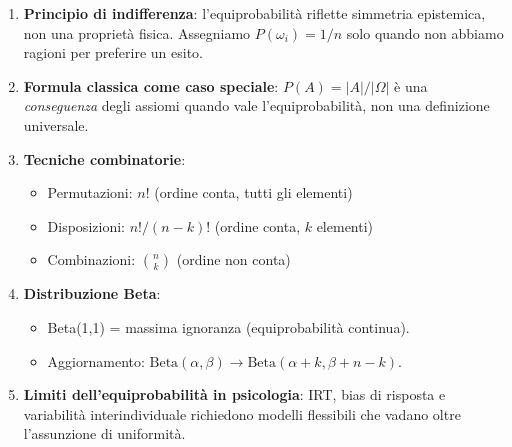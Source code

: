 \documentclass[
  italian,
  letterpaper,
  a4paper,
  11pt,
  open=any]{scrbook}
\providecommand{\tightlist}{%
  \setlength{\itemsep}{0pt}\setlength{\parskip}{0pt}}
\theoremstyle{plain}
\theoremstyle{definition}
\theoremstyle{definition}
\theoremstyle{remark}
\begin{document}
\begin{tcolorbox}[enhanced jigsaw, arc=.35mm, bottomrule=.15mm, bottomtitle=1mm, breakable, colback=white, colbacktitle=quarto-callout-important-color!10!white, colframe=quarto-callout-important-color-frame, coltitle=black, left=2mm, leftrule=.75mm, opacityback=0, opacitybacktitle=0.6, rightrule=.15mm, title=\textcolor{quarto-callout-important-color}{\faExclamation}\hspace{0.5em}{Importante}, titlerule=0mm, toprule=.15mm, toptitle=1mm]

\begin{enumerate}
\def\labelenumi{\arabic{enumi}.}
\item
  \textbf{Principio di indifferenza}: l'equiprobabilità riflette
  simmetria epistemica, non una proprietà fisica. Assegniamo
  \(P(\omega_i) = 1/n\) solo quando non abbiamo ragioni per preferire un
  esito.
\item
  \textbf{Formula classica come caso speciale}: \(P(A) = |A|/|\Omega|\)
  è una \emph{conseguenza} degli assiomi quando vale l'equiprobabilità,
  non una definizione universale.
\item
  \textbf{Tecniche combinatorie}:

  \begin{itemize}
  \tightlist
  \item
    Permutazioni: \(n!\) (ordine conta, tutti gli elementi)
  \item
    Disposizioni: \(n!/(n-k)!\) (ordine conta, \(k\) elementi)
  \item
    Combinazioni: \(\binom{n}{k}\) (ordine non conta)
  \end{itemize}
\item
  \textbf{Distribuzione Beta}:

  \begin{itemize}
  \tightlist
  \item
    Beta(1,1) = massima ignoranza (equiprobabilità continua).
  \item
    Aggiornamento:
    \(\text{Beta}(\alpha, \beta) \to \text{Beta}(\alpha+k, \beta+n-k)\).
  \end{itemize}
\item
  \textbf{Limiti dell'equiprobabilità in psicologia}: IRT, bias di
  risposta e variabilità interindividuale richiedono modelli flessibili
  che vadano oltre l'assunzione di uniformità.
\end{enumerate}

\end{tcolorbox}
\end{document}
